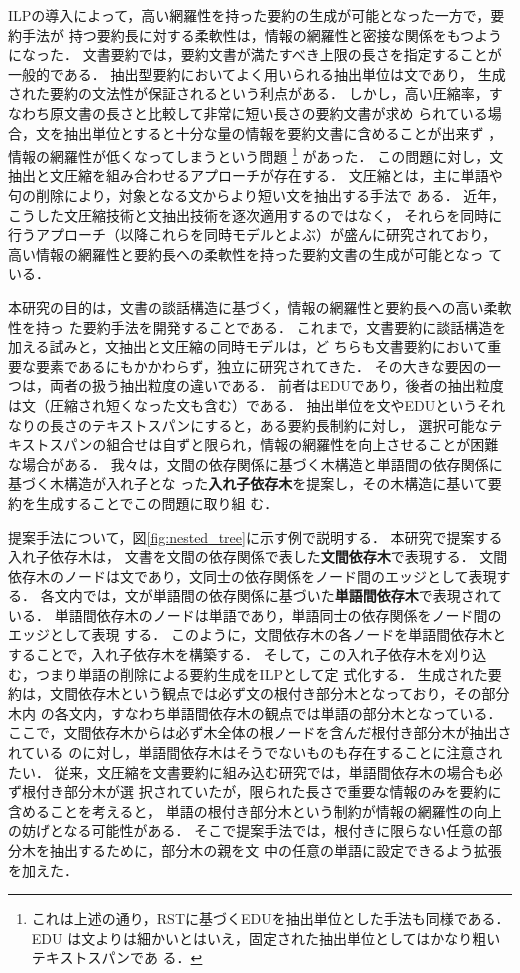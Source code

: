 \documentclass[japanese]{jnlp_1.4}
\begin{document}
ILPの導入によって，高い網羅性を持った要約の生成が可能となった一方で，要約手法が
持つ要約長に対する柔軟性は，情報の網羅性と密接な関係をもつようになった．
文書要約では，要約文書が満たすべき上限の長さを指定することが一般的である．
抽出型要約においてよく用いられる抽出単位は文であり，
生成された要約の文法性が保証されるという利点がある．
しかし，高い圧縮率，すなわち原文書の長さと比較して非常に短い長さの要約文書が求め
られている場合，文を抽出単位とすると十分な量の情報を要約文書に含めることが出来ず
，情報の網羅性が低くなってしまうという問題
\footnote{これは上述の通り，RSTに基づくEDUを抽出単位とした手法も同様である．EDU
は文よりは細かいとはいえ，固定された抽出単位としてはかなり粗いテキストスパンであ
る．}
があった．
この問題に対し，文抽出と文圧縮を組み合わせるアプローチが存在する．
文圧縮とは，主に単語や句の削除により，対象となる文からより短い文を抽出する手法で
ある．
近年，こうした文圧縮技術と文抽出技術を逐次適用するのではなく，
それらを同時に行うアプローチ（以降これらを同時モデルとよぶ）が盛んに研究されており，
高い情報の網羅性と要約長への柔軟性を持った要約文書の生成が可能となっ
ている．

本研究の目的は，文書の談話構造に基づく，情報の網羅性と要約長への高い柔軟性を持っ
た要約手法を開発することである．
これまで，文書要約に談話構造を加える試みと，文抽出と文圧縮の同時モデルは，ど
ちらも文書要約において重要な要素であるにもかかわらず，独立に研究されてきた．
その大きな要因の一つは，両者の扱う抽出粒度の違いである．
前者はEDUであり，後者の抽出粒度は文（圧縮され短くなった文も含む）である．
抽出単位を文やEDUというそれなりの長さのテキストスパンにすると，ある要約長制約に対し，
選択可能なテキストスパンの組合せは自ずと限られ，情報の網羅性を向上させることが困難
な場合がある．
我々は，文間の依存関係に基づく木構造と単語間の依存関係に基づく木構造が入れ子とな
った{\bf 入れ子依存木}を提案し，その木構造に基いて要約を生成することでこの問題に取り組
む．

提案手法について，図\ref{fig:nested_tree}に示す例で説明する．
本研究で提案する入れ子依存木は，
文書を文間の依存関係で表した{\bf 文間依存木}で表現する．
文間依存木のノードは文であり，文同士の依存関係をノード間のエッジとして表現する．
各文内では，文が単語間の依存関係に基づいた{\bf 単語間依存木}で表現されている．
単語間依存木のノードは単語であり，単語同士の依存関係をノード間のエッジとして表現
する．
このように，文間依存木の各ノードを単語間依存木とすることで，入れ子依存木を構築する．
そして，この入れ子依存木を刈り込む，つまり単語の削除による要約生成をILPとして定
式化する．
生成された要約は，文間依存木という観点では必ず文の根付き部分木となっており，その部分木内
の各文内，すなわち単語間依存木の観点では単語の部分木となっている．
ここで，文間依存木からは必ず木全体の根ノードを含んだ根付き部分木が抽出されている
のに対し，単語間依存木はそうでないものも存在することに注意されたい．
従来，文圧縮を文書要約に組み込む研究では，単語間依存木の場合も必ず根付き部分木が選
択されていたが，限られた長さで重要な情報のみを要約に含めることを考えると，
単語の根付き部分木という制約が情報の網羅性の向上の妨げとなる可能性がある．
そこで提案手法では，根付きに限らない任意の部分木を抽出するために，部分木の親を文
中の任意の単語に設定できるよう拡張を加えた．
\end{document}

